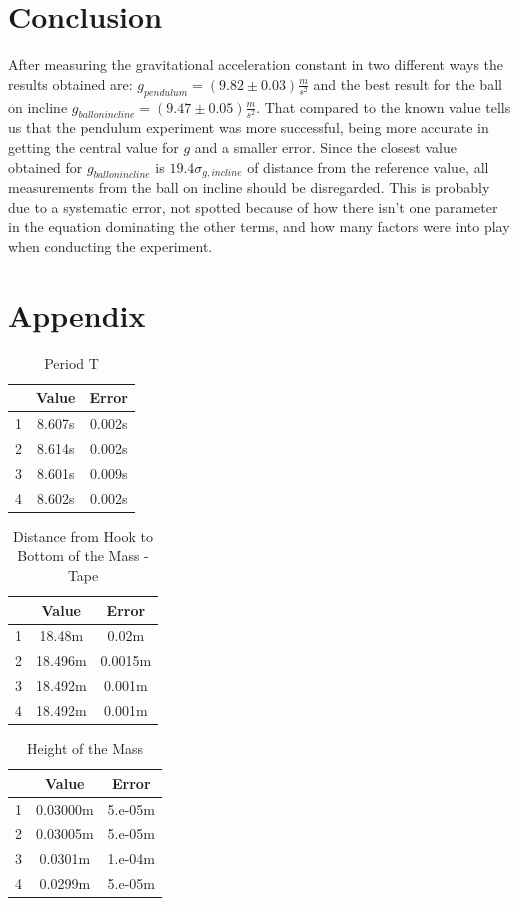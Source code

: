 \documentclass[a4paper,%
               aps,%
               prl,%
               amsfonts,%
               amssymb,%
               amsmath,%
               nobibnotes,%
               twocolumn, %
               twoside,%
               balancelastpage,%
               eqsecnum] %
               {revtex4-1}
\begin{document}
\section{Conclusion}
After measuring the gravitational acceleration constant in two different ways the results obtained are: $g_{pendulum}=(9.82 \pm 0.03)\frac{m}{s^2}$ and the best result for the ball on incline $g_{ball on incline}=(9.47 \pm 0.05)\frac{m}{s^2}$. That compared to the known value tells us that the pendulum experiment was more successful, being more accurate in getting the central value for $g$ and a smaller error. Since the closest value obtained for $g_{ball on incline}$ is $19.4 \sigma_{g,incline}$ of distance from the reference value, all measurements from the ball on incline should be disregarded. This is probably due to a systematic error, not spotted because of how there isn't one parameter in the equation dominating the other terms, and how many factors were into play when conducting the experiment.




\section{Appendix}


\begin{table}[H]
\centering
\begin{tabular}[t]{lcc}
\hline
&Value &Error\\
\hline
1&8.607s&0.002s\\
2&8.614s&0.002s\\
3&8.601s&0.009s\\
4&8.602s&0.002s\\
\hline
\end{tabular}
\caption{Period T}
\label{tab:periods}
\end{table}

\begin{table}[H]
\centering
\begin{tabular}[t]{lcc}
\hline
&Value &Error\\
\hline
1&18.48m&0.02m\\
2&18.496m&0.0015m\\
3&18.492m&0.001m\\
4&18.492m&0.001m\\
\hline
\end{tabular}
\caption{Distance from Hook to Bottom of the Mass - Tape}
\end{table}

\begin{table}[H]
\centering
\begin{tabular}[t]{lcc}
\hline
&Value &Error\\
\hline
1&0.03000m&5.e-05m\\
2&0.03005m&5.e-05m\\
3&0.0301m&1.e-04m\\
4&0.0299m&5.e-05m\\
\hline
\end{tabular}
\caption{Height of the Mass}
\end{table}
\end{document}
